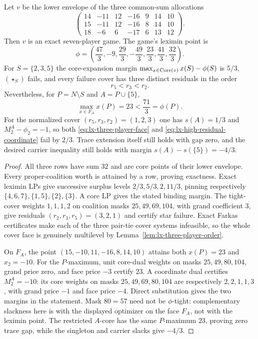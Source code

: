 \begin{proposition}
\label{prop:lx-three-player-face-target-counterexample}
Let $v$ be the lower envelope of the three common-sum allocations
\[
 \begin{pmatrix}
 14&-11&12&-16&9&14&10\\
 15&-11&12&-16&8&14&10\\
 18& -6& 6&-17&6&13&12
 \end{pmatrix}.
\]
Then $v$ is an exact seven-player game.  The game's leximin point is
\[
 \phi=\left(\frac{47}{3},-9,\frac{29}{3},-\frac{49}{3},
              \frac{23}{3},\frac{41}{3},\frac{32}{3}\right).
\]
For $S=\{2,3,5\}$ the core-expansion margin
$\max_{x\in\operatorname{Core}(v)}x(S)-\phi(S)$ is $5/3$, $(\star_S)$ fails, and every failure cover
has three distinct residuals in the order
\[
 r_5<r_3<r_2.
\]
Nevertheless, for $P=N\setminus S$ and $A=P\cup\{5\}$,
\[
 \max_{x\in F_A}x(P)=23<\frac{71}{3}=\phi(P).       \tag{FCX}
 \label{eq:lx-face-target-counterexample}
\]
For the normalized cover $(r_5,r_3,r_2)=(1,2,3)$ one has
$s(A)=1/3$ and $M_2^A-\phi_2=-1$, so both
\eqref{eq:lx-three-player-face} and
\eqref{eq:lx-high-residual-coordinate} fail by $2/3$.
Trace extension itself still holds with gap zero, and the desired carrier
inequality still holds with margin
$s(A)-s(\{5\})=-4/3$.
\end{proposition}

\begin{proof}
All three rows have sum $32$ and are core points of their lower envelope.
Every proper-coalition worth is attained by a row, proving exactness.  Exact
leximin LPs give successive surplus levels
$2/3,5/3,2,11/3$, pinning respectively
$\{4,6,7\},\{1,5\},\{2\},\{3\}$.  A core LP gives the stated binding
margin.  The tight-cover weights $1,1,1,2$ on coalition masks
$25,49,69,104$, with grand coefficient $3$, give residuals
$(r_2,r_3,r_5)=(3,2,1)$ and certify star failure.  Exact Farkas certificates
make each of the three pair-tie cover systems infeasible, so the whole cover
face is genuinely multilevel by Lemma~\ref{lem:lx-three-player-order}.

On $F_A$, the point
$(15,-10,11,-16,8,14,10)$ attains both $x(P)=23$ and $x_2=-10$.
For the $P$-maximum, unit core-dual weights on masks $25,49,80,104$, grand
price zero, and face price $-3$ certify $23$.  A coordinate dual certifies
$M_2^A=-10$: its core weights on masks $25,49,69,80,104$ are respectively
$2,2,1,1,3$, with grand price $-1$ and face price $-4$.  Direct substitution
gives the two margins in the statement.
Mask $80=57$ need not be $\phi$-tight: complementary slackness here is with
the displayed optimizer on the face $F_A$, not with the leximin point.
The restricted $A$-core has the same $P$-maximum $23$, proving zero trace
gap, while the singleton and carrier slacks give $-4/3$.
\end{proof}

